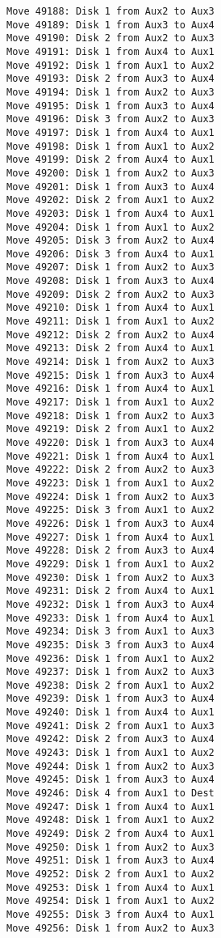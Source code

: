 \documentclass[11pt]{article}
\begin{document}
\begin{multicols}{2}
\begin{Verbatim}[fontsize=\small]
Move 49188: Disk 1 from Aux2 to Aux3
Move 49189: Disk 1 from Aux3 to Aux4
Move 49190: Disk 2 from Aux2 to Aux3
Move 49191: Disk 1 from Aux4 to Aux1
Move 49192: Disk 1 from Aux1 to Aux2
Move 49193: Disk 2 from Aux3 to Aux4
Move 49194: Disk 1 from Aux2 to Aux3
Move 49195: Disk 1 from Aux3 to Aux4
Move 49196: Disk 3 from Aux2 to Aux3
Move 49197: Disk 1 from Aux4 to Aux1
Move 49198: Disk 1 from Aux1 to Aux2
Move 49199: Disk 2 from Aux4 to Aux1
Move 49200: Disk 1 from Aux2 to Aux3
Move 49201: Disk 1 from Aux3 to Aux4
Move 49202: Disk 2 from Aux1 to Aux2
Move 49203: Disk 1 from Aux4 to Aux1
Move 49204: Disk 1 from Aux1 to Aux2
Move 49205: Disk 3 from Aux2 to Aux4
Move 49206: Disk 3 from Aux4 to Aux1
Move 49207: Disk 1 from Aux2 to Aux3
Move 49208: Disk 1 from Aux3 to Aux4
Move 49209: Disk 2 from Aux2 to Aux3
Move 49210: Disk 1 from Aux4 to Aux1
Move 49211: Disk 1 from Aux1 to Aux2
Move 49212: Disk 2 from Aux2 to Aux4
Move 49213: Disk 2 from Aux4 to Aux1
Move 49214: Disk 1 from Aux2 to Aux3
Move 49215: Disk 1 from Aux3 to Aux4
Move 49216: Disk 1 from Aux4 to Aux1
Move 49217: Disk 1 from Aux1 to Aux2
Move 49218: Disk 1 from Aux2 to Aux3
Move 49219: Disk 2 from Aux1 to Aux2
Move 49220: Disk 1 from Aux3 to Aux4
Move 49221: Disk 1 from Aux4 to Aux1
Move 49222: Disk 2 from Aux2 to Aux3
Move 49223: Disk 1 from Aux1 to Aux2
Move 49224: Disk 1 from Aux2 to Aux3
Move 49225: Disk 3 from Aux1 to Aux2
Move 49226: Disk 1 from Aux3 to Aux4
Move 49227: Disk 1 from Aux4 to Aux1
Move 49228: Disk 2 from Aux3 to Aux4
Move 49229: Disk 1 from Aux1 to Aux2
Move 49230: Disk 1 from Aux2 to Aux3
Move 49231: Disk 2 from Aux4 to Aux1
Move 49232: Disk 1 from Aux3 to Aux4
Move 49233: Disk 1 from Aux4 to Aux1
Move 49234: Disk 3 from Aux1 to Aux3
Move 49235: Disk 3 from Aux3 to Aux4
Move 49236: Disk 1 from Aux1 to Aux2
Move 49237: Disk 1 from Aux2 to Aux3
Move 49238: Disk 2 from Aux1 to Aux2
Move 49239: Disk 1 from Aux3 to Aux4
Move 49240: Disk 1 from Aux4 to Aux1
Move 49241: Disk 2 from Aux1 to Aux3
Move 49242: Disk 2 from Aux3 to Aux4
Move 49243: Disk 1 from Aux1 to Aux2
Move 49244: Disk 1 from Aux2 to Aux3
Move 49245: Disk 1 from Aux3 to Aux4
Move 49246: Disk 4 from Aux1 to Dest
Move 49247: Disk 1 from Aux4 to Aux1
Move 49248: Disk 1 from Aux1 to Aux2
Move 49249: Disk 2 from Aux4 to Aux1
Move 49250: Disk 1 from Aux2 to Aux3
Move 49251: Disk 1 from Aux3 to Aux4
Move 49252: Disk 2 from Aux1 to Aux2
Move 49253: Disk 1 from Aux4 to Aux1
Move 49254: Disk 1 from Aux1 to Aux2
Move 49255: Disk 3 from Aux4 to Aux1
Move 49256: Disk 1 from Aux2 to Aux3

\end{Verbatim}
\end{multicols}
\end{document}
